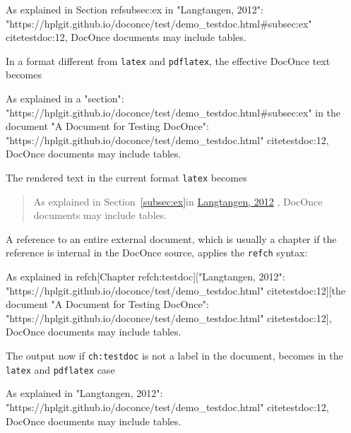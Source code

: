\documentclass[%
oneside,                 %
final,                   %
chapterprefix=true,      %
open=right,              %
10pt]{book}
\begin{document}
\bdat
As explained in
Section ref{subsec:ex} in "Langtangen, 2012":
"https://hplgit.github.io/doconce/test/demo_testdoc.html#subsec:ex"
cite{testdoc:12}, DocOnce documents may include tables.

\edat

In a format different from \texttt{latex} and \texttt{pdflatex}, the effective DocOnce
text becomes







\bdat
As explained in
a "section":
"https://hplgit.github.io/doconce/test/demo_testdoc.html#subsec:ex" in
the document "A Document for Testing DocOnce":
"https://hplgit.github.io/doconce/test/demo_testdoc.html"
cite{testdoc:12}, DocOnce documents may include tables.

\edat

The rendered text in the current format \texttt{latex} becomes


\begin{quote}
As explained in
Section~\ref{subsec:ex}in \href{{https://hplgit.github.io/doconce/test/demo_testdoc.html#subsec:ex}}{Langtangen, 2012}
\cite{testdoc:12}, DocOnce documents may include tables.
\end{quote}


A reference to an entire external document, which is usually a chapter
if the reference is internal in the DocOnce source, applies the
\texttt{refch} syntax:









\bdat
As explained in
refch[Chapter ref{ch:testdoc}]["Langtangen, 2012":
"https://hplgit.github.io/doconce/test/demo_testdoc.html"
cite{testdoc:12}][the document
"A Document for Testing DocOnce":
"https://hplgit.github.io/doconce/test/demo_testdoc.html"
cite{testdoc:12}], DocOnce documents may include tables.

\edat

The output now if \texttt{ch:testdoc} is not a label in the document,
becomes in the \texttt{latex} and \texttt{pdflatex} case






\bdat
As explained in
"Langtangen, 2012":
"https://hplgit.github.io/doconce/test/demo_testdoc.html"
cite{testdoc:12}, DocOnce documents may include tables.

\edat
\end{document}
